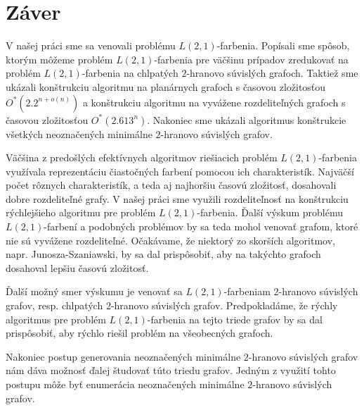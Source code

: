\chapter*{Záver}  %

V našej práci sme sa venovali problému $L(2,1)$-farbenia. Popísali sme spôsob, ktorým
môžeme problém $L(2,1)$-farbenia pre väčšinu prípadov zredukovať na problém $L(2,1)$-farbenia
na chlpatých $2$-hranovo súvislých grafoch. Taktiež sme ukázali konštrukciu
algoritmu na planárnych grafoch s časovou zložitosťou $O^*(2.2^{n + o(n)})$
a konštrukciu algoritmu na vyvážene rozdeliteľných grafoch s časovou zložitosťou
$O^*(2.613^n)$. Nakoniec sme ukázali algoritmus konštrukcie všetkých neoznačených
minimálne $2$-hranovo súvislých grafov.

Väčšina z predošlých efektívnych algoritmov riešiacich problém $L(2,1)$-farbenia
využívala reprezentáciu čiastočných farbení pomocou ich charakteristík. Najväčší
počet rôznych charakteristík, a teda aj najhoršiu časovú zložitosť, dosahovali
dobre rozdeliteľné grafy. V našej práci sme využili rozdeliteľnosť na konštrukciu
rýchlejšieho algoritmu pre problém $L(2,1)$-farbenia. Ďalší výskum problému
$L(2,1)$-farbení a podobných problémov by sa teda mohol venovať grafom, ktoré
nie sú vyvážene rozdeliteľné. Očakávame, že niektorý zo skorších
algoritmov, napr. Junosza-Szaniawski, by sa dal prispôsobiť, aby na takýchto
grafoch dosahoval lepšiu časovú zložitosť.

Ďalší možný smer výskumu je venovať sa $L(2,1)$-farbeniam $2$-hranovo
súvislých grafov, resp. chlpatých $2$-hranovo súvislých grafov. Predpokladáme,
že rýchly algoritmus pre problém $L(2,1)$-farbenia na tejto triede grafov
by sa dal prispôsobiť, aby rýchlo riešil problém na všeobecných grafoch.

Nakoniec postup generovania neoznačených minimálne $2$-hranovo súvislých
grafov nám dáva možnosť ďalej študovať túto triedu grafov. Jedným z využití
tohto postupu môže byť enumerácia neoznačených minimálne $2$-hranovo súvislých
grafov.
